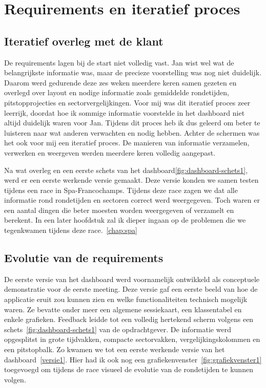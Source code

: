 
\chapter{Requirements en iteratief proces}
\label{chap:requirements}


\section{Iteratief overleg met de klant}
De requirements lagen bij de start niet volledig vast. Jan wist wel wat de belangrijkste informatie was, maar de precieze voorstelling was nog niet duidelijk. Daarom werd gedurende deze zes weken meerdere keren samen gezeten en overlegd over layout en nodige informatie zoals gemiddelde rondetijden, pitstopprojecties en sectorvergelijkingen. Voor mij was dit iteratief proces zeer leerrijk, doordat hoe ik sommige informatie voorstelde in het dashboard niet altijd duidelijk waren voor Jan. Tijdens dit proces heb ik dus geleerd om beter te luisteren naar wat anderen verwachten en nodig hebben. Achter de schermen was het ook voor mij een iteratief proces. De manieren van informatie verzamelen, verwerken en weergeven werden meerdere keren volledig aangepast. 

Na wat overleg en een eerste schets van het dashboard\ref{fig:dashboard-schets1}, werd er een eerste werkende versie gemaakt. Deze versie konden we samen testen tijdens een race in Spa-Francochamps. Tijdens deze race zagen we dat alle informatie rond rondetijden en sectoren correct werd weergegeven. Toch waren er een aantal dingen die beter moesten worden weergegeven of verzamelt en berekent. In een later hoofdstuk zal ik dieper ingaan op de problemen die we tegenkwamen tijdens deze race.~\ref{chap:spa}

\section{Evolutie van de requirements}
De eerste versie van het dashboard werd voornamelijk ontwikkeld als conceptuele demonstratie voor de eerste meeting. Deze versie gaf een eerste beeld van hoe de applicatie eruit zou kunnen zien en welke functionaliteiten technisch mogelijk waren. Ze bevatte onder meer een algemene sessiekaart, een klassentabel en enkele grafieken. 
Feedback leidde tot een volledig hertekend scherm volgens een schets~\ref{fig:dashboard-schets1} van de opdrachtgever. De informatie werd opgesplitst in grote tijdvakken, compacte sectorvakken, vergelijkingskolommen en een pitstopbalk. Zo kwamen we tot een eerste werkende versie van het dashboard~\ref{versie1}. Hier had ik ook nog een grafiekenvenster~\ref{fig:grafiekvenster1} toegevoegd om tijdens de race visueel de evolutie van de rondetijden te kunnen volgen.

